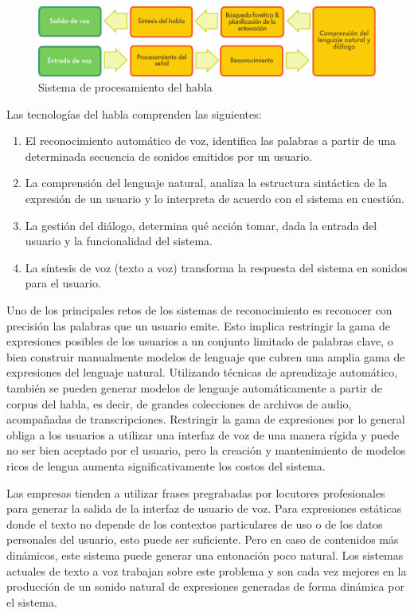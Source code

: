 \begin{multicols}{2}
\begin{figure}[htb]
  \center  \includegraphics[width=\textwidth]{../_media/spanish/simple_speech-based_dialogue_architecture}
  \center
  \caption{Sistema de procesamiento del habla}
  \label{fig:dialoguearch_de}
\end{figure}

Las tecnologías del habla comprenden las siguientes:

\begin{enumerate}
  \item El reconocimiento automático de voz, identifica las palabras a partir de una determinada secuencia de sonidos emitidos por un usuario.
  \item La comprensión del lenguaje natural, analiza la estructura sintáctica de la expresión de un usuario y lo interpreta de acuerdo con el sistema en cuestión.
  \item La gestión del diálogo, determina qué acción tomar, dada la entrada del usuario y la funcionalidad del sistema.
  \item La síntesis de voz (texto a voz) transforma la respuesta del sistema en sonidos para el usuario.
\end{enumerate}

Uno de los principales retos de los sistemas de reconocimiento es reconocer con precisión las palabras que un usuario emite. Esto implica restringir la gama de expresiones posibles de los usuarios a un conjunto limitado de palabras clave, o bien construir manualmente modelos de lenguaje que cubren una amplia gama de expresiones del lenguaje natural. Utilizando técnicas de aprendizaje automático, también se pueden generar modelos de lenguaje automáticamente a partir de corpus del habla, es decir,  de grandes colecciones de archivos de audio, acompañadas de transcripciones. Restringir la gama de expresiones por lo general obliga a los usuarios a utilizar una interfaz de voz de una manera rígida y puede no ser bien aceptado por el usuario, pero la creación y mantenimiento de modelos ricos de lengua aumenta significativamente los costos del sistema. 

Las empresas tienden a utilizar frases pregrabadas por locutores profesionales para generar la salida de la interfaz de usuario de voz. Para expresiones estáticas donde el texto no depende de los contextos particulares de uso o de los datos personales del usuario, esto puede ser suficiente. Pero en caso de contenidos más dinámicos, este sistema puede generar una entonación poco natural. Los sistemas actuales de texto a voz trabajan sobre este problema y son cada vez mejores en la producción de un sonido natural de expresiones generadas de forma dinámica por el sistema.


\end{multicols}
